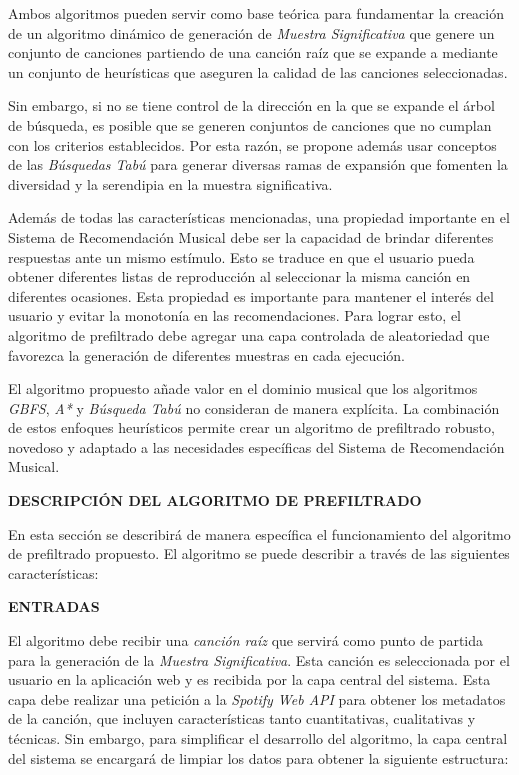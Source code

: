 Ambos algoritmos pueden servir como base teórica para fundamentar la creación de un algoritmo dinámico de generación de \textit{Muestra Significativa} que genere un conjunto de canciones partiendo de una canción raíz que se expande a mediante un conjunto de heurísticas que aseguren la calidad de las canciones seleccionadas.

Sin embargo, si no se tiene control de la dirección en la que se expande el árbol de búsqueda, es posible que se generen conjuntos de canciones que no cumplan con los criterios establecidos. Por esta razón, se propone además usar conceptos de las \textit{Búsquedas Tabú} para generar diversas ramas de expansión que fomenten la diversidad y la serendipia en la muestra significativa.

Además de todas las características mencionadas, una propiedad importante en el Sistema de Recomendación Musical debe ser la capacidad de brindar diferentes respuestas ante un mismo estímulo. Esto se traduce en que el usuario pueda obtener diferentes listas de reproducción al seleccionar la misma canción en diferentes ocasiones. Esta propiedad es importante para mantener el interés del usuario y evitar la monotonía en las recomendaciones. Para lograr esto, el algoritmo de prefiltrado debe agregar una capa controlada de aleatoriedad que favorezca la generación de diferentes muestras en cada ejecución.

El algoritmo propuesto añade valor en el dominio musical que los algoritmos \textit{GBFS}, \textit{A*} y \textit{Búsqueda Tabú} no consideran de manera explícita. La combinación de estos enfoques heurísticos permite crear un algoritmo de prefiltrado robusto, novedoso y adaptado a las necesidades específicas del Sistema de Recomendación Musical.

\textbf{DESCRIPCIÓN DEL ALGORITMO DE PREFILTRADO}

En esta sección se describirá de manera específica el funcionamiento del algoritmo de prefiltrado propuesto. El algoritmo se puede describir a través de las siguientes características:

\textbf{ENTRADAS}

El algoritmo debe recibir una \textit{canción raíz} que servirá como punto de partida para la generación de la \textit{Muestra Significativa}. Esta canción es seleccionada por el usuario en la aplicación web y es recibida por la capa central del sistema. Esta capa debe realizar una petición a la \textit{Spotify Web API} para obtener los metadatos de la canción, que incluyen características tanto cuantitativas, cualitativas y técnicas. Sin embargo, para simplificar el desarrollo del algoritmo, la capa central del sistema se encargará de limpiar los datos para obtener la siguiente estructura:

